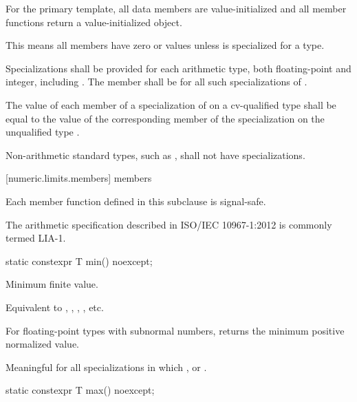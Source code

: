 \pnum
For the
primary template, all data members are value-initialized and all
member functions return a value-initialized object.
\begin{note}
This means all members have zero or  values
unless  is specialized for a type.
\end{note}

\pnum
Specializations shall be provided for each
arithmetic type,
both floating-point and integer, including
.
The member
shall be
for all such specializations of
.

\pnum
The value of each member of a specialization of
 on a cv-qualified type
 shall be equal to the value of the corresponding member of
the specialization on the unqualified type .

\pnum
Non-arithmetic standard types, such as
, shall not have specializations.

[numeric.limits.members]{ members}

\pnum
{}%
Each member function defined in this subclause is signal-safe.
\begin{note}
%
The arithmetic specification described in ISO/IEC 10967-1:2012 is
commonly termed LIA-1.
\end{note}

%
\begin{itemdecl}
static constexpr T min() noexcept;
\end{itemdecl}

\begin{itemdescr}
\pnum
Minimum finite value.
\begin{footnote}
Equivalent to , ,
, , etc.
\end{footnote}

%
\pnum
For floating-point types with subnormal numbers, returns the minimum positive
normalized value.

\pnum
Meaningful for all specializations in which
,
or
.
\end{itemdescr}

%
\begin{itemdecl}
static constexpr T max() noexcept;
\end{itemdecl}

